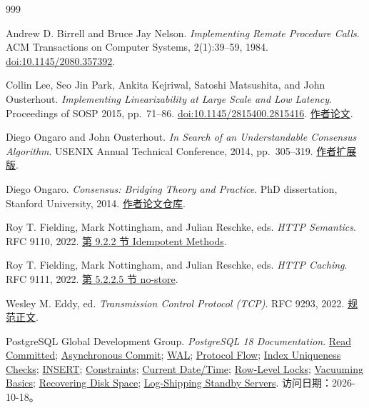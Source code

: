 \begin{thebibliography}{999}
\label{book:references}
\raggedright

Andrew D. Birrell and Bruce Jay Nelson.
\textit{Implementing Remote Procedure Calls}.
ACM Transactions on Computer Systems, 2(1):39--59, 1984.
\href{https://doi.org/10.1145/2080.357392}{doi:10.1145/2080.357392}.

Collin Lee, Seo Jin Park, Ankita Kejriwal, Satoshi Matsushita, and John Ousterhout.
\textit{Implementing Linearizability at Large Scale and Low Latency}.
Proceedings of SOSP 2015, pp.\ 71--86.
\href{https://doi.org/10.1145/2815400.2815416}{doi:10.1145/2815400.2815416}.
\href{https://web.stanford.edu/~ouster/cgi-bin/papers/rifl.pdf}{作者论文}.

Diego Ongaro and John Ousterhout.
\textit{In Search of an Understandable Consensus Algorithm}.
USENIX Annual Technical Conference, 2014, pp.\ 305--319.
\href{https://raft.github.io/raft.pdf}{作者扩展版}.

Diego Ongaro.
\textit{Consensus: Bridging Theory and Practice}.
PhD dissertation, Stanford University, 2014.
\href{https://github.com/ongardie/dissertation}{作者论文仓库}.

Roy T. Fielding, Mark Nottingham, and Julian Reschke, eds.
\textit{HTTP Semantics}. RFC 9110, 2022.
\href{https://www.rfc-editor.org/rfc/rfc9110.html#section-9.2.2}{第 9.2.2 节 Idempotent Methods}.

Roy T. Fielding, Mark Nottingham, and Julian Reschke, eds.
\textit{HTTP Caching}. RFC 9111, 2022.
\href{https://www.rfc-editor.org/rfc/rfc9111.html#section-5.2.2.5}{第 5.2.2.5 节 no-store}.

Wesley M. Eddy, ed.
\textit{Transmission Control Protocol (TCP)}. RFC 9293, 2022.
\href{https://www.rfc-editor.org/rfc/rfc9293.html}{规范正文}.

PostgreSQL Global Development Group.
\textit{PostgreSQL 18 Documentation}.
\href{https://www.postgresql.org/docs/18/transaction-iso.html#XACT-READ-COMMITTED}{Read Committed};
\href{https://www.postgresql.org/docs/18/wal-async-commit.html}{Asynchronous Commit};
\href{https://www.postgresql.org/docs/18/runtime-config-wal.html}{WAL};
\href{https://www.postgresql.org/docs/18/protocol-flow.html}{Protocol Flow};
\href{https://www.postgresql.org/docs/18/index-unique-checks.html}{Index Uniqueness Checks};
\href{https://www.postgresql.org/docs/18/sql-insert.html}{INSERT};
\href{https://www.postgresql.org/docs/18/ddl-constraints.html}{Constraints};
\href{https://www.postgresql.org/docs/18/functions-datetime.html#FUNCTIONS-DATETIME-CURRENT}{Current Date/Time};
\href{https://www.postgresql.org/docs/18/explicit-locking.html#LOCKING-ROWS}{Row-Level Locks};
\href{https://www.postgresql.org/docs/18/routine-vacuuming.html#VACUUM-BASICS}{Vacuuming Basics};
\href{https://www.postgresql.org/docs/18/routine-vacuuming.html#VACUUM-FOR-SPACE-RECOVERY}{Recovering Disk Space};
\href{https://www.postgresql.org/docs/18/warm-standby.html}{Log-Shipping Standby Servers}.
访问日期：2026-10-18。


\end{thebibliography}
